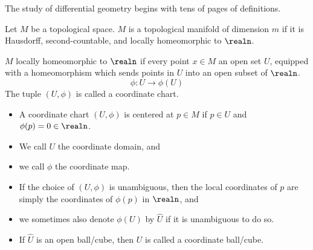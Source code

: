 \documentclass[../main-v2-manifolds.tex]{subfiles}
\begin{document}
\providecommand{\szz}{\mathcal{S}}
\providecommand{\ccinf}{C_c^\infty}

\providecommand{\Taux}{\Tau_\xx}
\providecommand{\Tauy}{\Tau_\yy}
\providecommand{\Tauxy}{\Tau_{\xx\times\yy}}

\providecommand{\Bx}{\borel_\xx}
\providecommand{\By}{\borel_\yy}
\providecommand{\Bxy}{\borel_{\xx\times\yy}}


\newpage
{}
The study of differential geometry begins with tens of pages of definitions.
\begin{definition}\label{lee-chp1:topological-manifold-definition}
    Let $M$ be a topological space. $M$ is a topological manifold of dimension $m$ if it is Hausdorff, second-countable, and locally homeomorphic to $\realn$.
\end{definition}

\begin{definition}\label{lee-chp1:locally-homeomorphic-definition}
    $M$ locally homeomorphic to $\realn$ if every point $x\in M$ an open set $U$, equipped with a homeomorphism which sends points in $U$ into an open subset of $\realn$. 
    \[
        \phi: U\to \phi(U)
    \] 
    The tuple $(U,\phi)$ is called a coordinate chart.
\end{definition}

\begin{definition}\label{lee-chp1:coordinate-chart-definition}
    \begin{itemize}
        \item A coordinate chart $(U,\phi)$ is centered at $p\in M$ if $p\in U$ and $\phi(p)=0\in\realn$.
        \item We call $U$ the coordinate domain, and
        \item we call $\phi$ the coordinate map.
        \item If the choice of $(U,\phi)$ is unambiguous, then the local coordinates of $p$ are simply the coordinates of $\phi(p)$ in $\realn$, and
        \item we sometimes also denote $\phi(U)$ by $\hat{U}$ if it is unambiguous to do so.
        \item If $\hat{U}$ is an open ball/cube, then $U$ is called a coordinate ball/cube.
    \end{itemize}
\end{definition}
\end{document}
